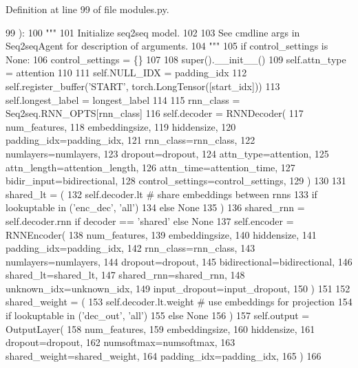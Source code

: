 Definition at line 99 of file modules.\+py.


\begin{DoxyCode}
99     ):
100         \textcolor{stringliteral}{"""}
101 \textcolor{stringliteral}{        Initialize seq2seq model.}
102 \textcolor{stringliteral}{}
103 \textcolor{stringliteral}{        See cmdline args in Seq2seqAgent for description of arguments.}
104 \textcolor{stringliteral}{        """}
105         \textcolor{keywordflow}{if} control\_settings \textcolor{keywordflow}{is} \textcolor{keywordtype}{None}:
106             control\_settings = \{\}
107 
108         super().\_\_init\_\_()
109         self.attn\_type = attention
110 
111         self.NULL\_IDX = padding\_idx
112         self.register\_buffer(\textcolor{stringliteral}{'START'}, torch.LongTensor([start\_idx]))
113         self.longest\_label = longest\_label
114 
115         rnn\_class = Seq2seq.RNN\_OPTS[rnn\_class]
116         self.decoder = RNNDecoder(
117             num\_features,
118             embeddingsize,
119             hiddensize,
120             padding\_idx=padding\_idx,
121             rnn\_class=rnn\_class,
122             numlayers=numlayers,
123             dropout=dropout,
124             attn\_type=attention,
125             attn\_length=attention\_length,
126             attn\_time=attention\_time,
127             bidir\_input=bidirectional,
128             control\_settings=control\_settings,
129         )
130 
131         shared\_lt = (
132             self.decoder.lt  \textcolor{comment}{# share embeddings between rnns}
133             \textcolor{keywordflow}{if} lookuptable \textcolor{keywordflow}{in} (\textcolor{stringliteral}{'enc\_dec'}, \textcolor{stringliteral}{'all'})
134             \textcolor{keywordflow}{else} \textcolor{keywordtype}{None}
135         )
136         shared\_rnn = self.decoder.rnn \textcolor{keywordflow}{if} decoder == \textcolor{stringliteral}{'shared'} \textcolor{keywordflow}{else} \textcolor{keywordtype}{None}
137         self.encoder = RNNEncoder(
138             num\_features,
139             embeddingsize,
140             hiddensize,
141             padding\_idx=padding\_idx,
142             rnn\_class=rnn\_class,
143             numlayers=numlayers,
144             dropout=dropout,
145             bidirectional=bidirectional,
146             shared\_lt=shared\_lt,
147             shared\_rnn=shared\_rnn,
148             unknown\_idx=unknown\_idx,
149             input\_dropout=input\_dropout,
150         )
151 
152         shared\_weight = (
153             self.decoder.lt.weight  \textcolor{comment}{# use embeddings for projection}
154             \textcolor{keywordflow}{if} lookuptable \textcolor{keywordflow}{in} (\textcolor{stringliteral}{'dec\_out'}, \textcolor{stringliteral}{'all'})
155             \textcolor{keywordflow}{else} \textcolor{keywordtype}{None}
156         )
157         self.output = OutputLayer(
158             num\_features,
159             embeddingsize,
160             hiddensize,
161             dropout=dropout,
162             numsoftmax=numsoftmax,
163             shared\_weight=shared\_weight,
164             padding\_idx=padding\_idx,
165         )
166 
\end{DoxyCode}


